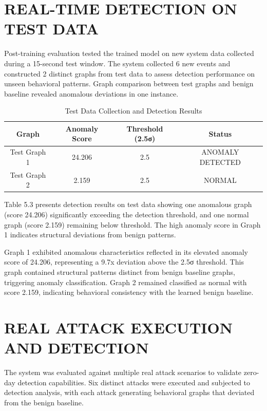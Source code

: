 \vspace{0.3cm}

\section{REAL-TIME DETECTION ON TEST DATA}

Post-training evaluation tested the trained model on new system data collected during a 15-second test window. The system collected 6 new events and constructed 2 distinct graphs from test data to assess detection performance on unseen behavioral patterns. Graph comparison between test graphs and benign baseline revealed anomalous deviations in one instance.

\begin{table}[h]
\centering
\caption{Test Data Collection and Detection Results}
\label{tab:test_data}
\begin{tabular}{|c|c|c|c|}
\hline
\textbf{Graph} & \textbf{Anomaly Score} & \textbf{Threshold (2.5σ)} & \textbf{Status} \\ \hline
Test Graph 1 & 24.206 & 2.5 & ANOMALY DETECTED \\ \hline
Test Graph 2 & 2.159 & 2.5 & NORMAL \\ \hline
\end{tabular}
\end{table}

Table 5.3 presents detection results on test data showing one anomalous graph (score 24.206) significantly exceeding the detection threshold, and one normal graph (score 2.159) remaining below threshold. The high anomaly score in Graph 1 indicates structural deviations from benign patterns.

Graph 1 exhibited anomalous characteristics reflected in its elevated anomaly score of 24.206, representing a 9.7x deviation above the 2.5σ threshold. This graph contained structural patterns distinct from benign baseline graphs, triggering anomaly classification. Graph 2 remained classified as normal with score 2.159, indicating behavioral consistency with the learned benign baseline.

\vspace{0.3cm}

\section{REAL ATTACK EXECUTION AND DETECTION}

The system was evaluated against multiple real attack scenarios to validate zero-day detection capabilities. Six distinct attacks were executed and subjected to detection analysis, with each attack generating behavioral graphs that deviated from the benign baseline.

